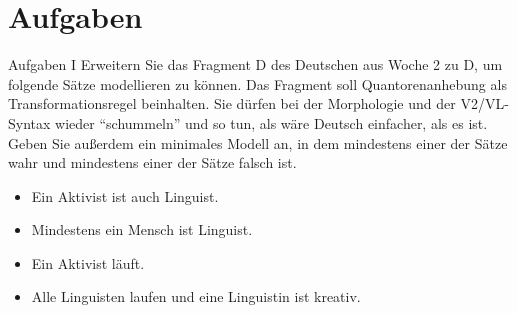 \section{Aufgaben}

\begin{frame}
  {Aufgaben I}
  Erweitern Sie das Fragment D des Deutschen aus Woche 2 zu D, um folgende Sätze modellieren zu können. Das Fragment soll Quantorenanhebung als Transformationsregel beinhalten. Sie dürfen bei der Morphologie und der V2\slash VL-Syntax wieder "`schummeln"' und so tun, als wäre Deutsch einfacher, als es ist. Geben Sie außerdem ein minimales Modell an, in dem mindestens einer der Sätze wahr und mindestens einer der Sätze falsch ist.\\
  \Halbzeile
  \Halbzeile
  \begin{itemize}[<+->]
    \item Ein Aktivist ist auch Linguist.
    \item Mindestens ein Mensch ist Linguist.
    \item Ein Aktivist läuft.
    \item Alle Linguisten laufen und eine Linguistin ist kreativ.
  \end{itemize}
\end{frame}


